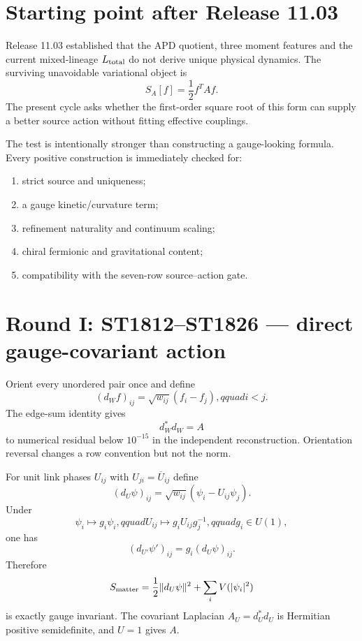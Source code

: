 \documentclass[11pt,a4paper]{article}
\begin{document}
\begin{abstract}
The direct gauge action therefore passes important conditional subrows of the
source--action gate but zero complete strict rows.  The highest-value next
theorem is now sharply identified: derive or refute an automorphism-natural,
refinement-functorial weighted 2-complex and face measure from FIN data.  Such
an object is required before a strict gauge kinetic action, locality or
continuum physics can be claimed.
\end{abstract}

\tableofcontents\newpage

\section{Starting point after Release 11.03}

Release 11.03 established that the APD quotient, three moment features and the
current mixed-lineage $L_{\rm total}$ do not derive unique physical dynamics.
The surviving unavoidable variational object is
\[
S_A[f]=\frac12f^TAf.
\]
The present cycle asks whether the first-order square root of this form can
supply a better source action without fitting effective couplings.

The test is intentionally stronger than constructing a gauge-looking formula.
Every positive construction is immediately checked for:
\begin{enumerate}
\item strict source and uniqueness;
\item a gauge kinetic/curvature term;
\item refinement naturality and continuum scaling;
\item chiral fermionic and gravitational content;
\item compatibility with the seven-row source--action gate.
\end{enumerate}

\section{Round I: ST1812--ST1826 --- direct gauge-covariant action}

Orient every unordered pair once and define
\[
(d_Wf)_{ij}=\sqrt{w_{ij}}(f_i-f_j),qquad i<j.
\]
The edge-sum identity gives
\[
d_W^*d_W=A
\]
to numerical residual below $10^{-15}$ in the independent reconstruction.
Orientation reversal changes a row convention but not the norm.

For unit link phases $U_{ij}$ with $U_{ji}=\overline{U}_{ij}$ define
\[
(d_U\psi)_{ij}=\sqrt{w_{ij}}(\psi_i-U_{ij}\psi_j).
\]
Under
\[
\psi_i\mapsto g_i\psi_i,qquad
U_{ij}\mapsto g_iU_{ij}g_j^{-1},qquad g_i\in U(1),
\]
one has
\[
(d_{U'}\psi')_{ij}=g_i(d_U\psi)_{ij}.
\]
Therefore
\[
S_{\rm matter}=\frac12\|d_U\psi\|^2+\sum_iV(|\psi_i|^2)
\]
is exactly gauge invariant.  The covariant Laplacian
$A_U=d_U^*d_U$ is Hermitian positive semidefinite, and $U=1$ gives $A$.
\end{document}
